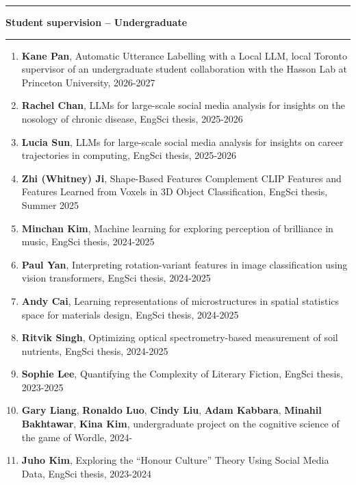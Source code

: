 \documentclass[letterpaper,11pt]{article}
\newcommand{\resheading}[1]{%
  \vspace{10pt}%
  \noindent\textcolor{accent}{\rule{3pt}{12pt}}\hspace{6pt}%
  {\large \textbf{\textcolor{accent}{#1}}}%
  \vspace{2pt}%
  \par\noindent\textcolor{accent!30}{\rule{\textwidth}{0.5pt}}%
  \vspace{2pt}%
}
\begin{document}
\newpage
\resheading{Student supervision -- Undergraduate}
\begin{enumerate}

    \item
    \textbf{Kane Pan}, Automatic Utterance Labelling with a Local LLM, local Toronto supervisor of an undergraduate student collaboration with the Hasson Lab at Princeton University, 2026-2027

    \item
    \textbf{Rachel Chan}, LLMs for large-scale social media analysis for insights on the nosology of chronic disease, EngSci thesis, 2025-2026

	
    
    \item 
    \textbf{Lucia Sun}, LLMs for large-scale social media analysis for insights on career trajectories in computing, EngSci thesis, 2025-2026

    \item
    \textbf{Zhi (Whitney) Ji}, Shape-Based Features Complement CLIP Features and Features Learned from Voxels in 3D Object Classification, EngSci thesis, Summer 2025

    \item
	\textbf{Minchan Kim}, Machine learning for exploring perception of brilliance in music, EngSci thesis, 2024-2025

	\item
	\textbf{Paul Yan}, Interpreting rotation-variant features in image classification using vision transformers, EngSci thesis, 2024-2025

	\item
	\textbf{Andy Cai}, Learning representations of microstructures in spatial statistics space for materials design, EngSci thesis, 2024-2025

	\item
	\textbf{Ritvik Singh}, Optimizing optical spectrometry-based measurement of soil nutrients, EngSci thesis, 2024-2025

	\item
	\textbf{Sophie Lee}, Quantifying the Complexity of Literary Fiction, EngSci thesis, 2023-2025
	\item
        \textbf{Gary Liang}, \textbf{Ronaldo Luo}, \textbf{Cindy Liu}, \textbf{Adam Kabbara}, \textbf{Minahil Bakhtawar}, \textbf{Kina Kim}, undergraduate project on the cognitive science of the game of Wordle, 2024-
    
	\item
	\textbf{Juho Kim}, Exploring the ``Honour Culture'' Theory Using Social Media Data, EngSci thesis, 2023-2024


\end{enumerate}
\end{document}
